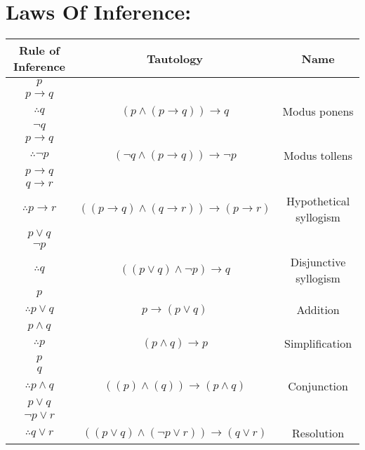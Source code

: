\documentclass{exam}
\begin{document}
\section{Laws Of Inference: }
\vspace{5mm}
\begin{center}
\begin{tabular}{|c|c|c|}
\hline
Rule of Inference & Tautology & Name \\
\hline
$p$ & & \\
$p \rightarrow q$ & & \\
\hline
$ \therefore q$ & $\left(p \land (p \rightarrow q)\right) \rightarrow q$ & Modus ponens \\

\hline
$\neg q$ & &\\
$p \rightarrow q$ & &\\
\hline
$\therefore \neg p$ & $\left(\neg q \land (p \rightarrow q)\right) \rightarrow \neg p$ & Modus tollens \\
\hline

$p \rightarrow q$ & &\\
$q \rightarrow r$ & & \\
\hline
$\therefore p \rightarrow r$ & $\left((p \rightarrow q) \land (q \rightarrow r)\right) \rightarrow (p \rightarrow r)$ & Hypothetical syllogism \\
\hline

$p \lor q$ & & \\
$\neg p$ & & \\
\hline
$\therefore q$ & $\left((p \lor q) \land \neg p\right) \rightarrow q$ 
& Disjunctive syllogism \\

\hline
$p$ & & \\
\hline
$\therefore p \lor q$
& $p \rightarrow (p \lor q)$ & Addition \\
\hline
$p \land q$ & &\\
\hline
$\therefore p$ & $(p \land q) \rightarrow p$ & Simplification \\
\hline
$p$ & &\\
$q$ & &\\
\hline
$\therefore p \land q$ & $ ((p) \land (q)) \rightarrow ( p \land q)$
& Conjunction \\
\hline
$p \lor q$ & & \\
$\neg p \lor r$ & & \\
\hline
$\therefore q \lor r$ & $
((p \lor q) \land (\neg p \lor r)) \rightarrow (q \lor r) $  &Resolution \\
\hline

\end{tabular}
\end{center}
\vspace{15mm}
\end{document}
